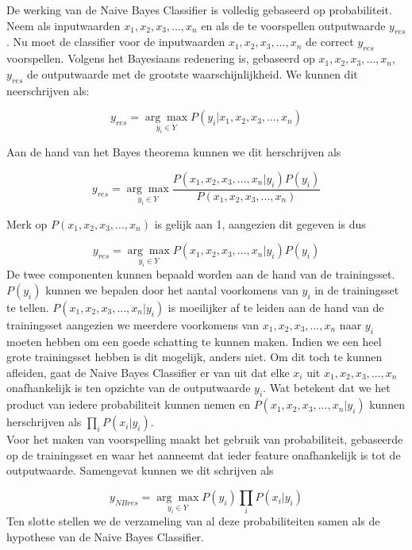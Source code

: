 %
De werking van de Naive Bayes Classifier is volledig gebaseerd op probabiliteit. Neem als inputwaarden $x_{1} , x_{2}, x_{3}, ..., x_{n}$ en als de te voorspellen outputwaarde $y_{res}$. Nu moet de classifier voor de inputwaarden $x_{1} , x_{2}, x_{3}, ..., x_{n}$ de correct $y_{res}$ voorspellen. Volgens het Bayesiaans redenering is, gebaseerd op $x_{1} , x_{2}, x_{3}, ..., x_{n}$,  $y_{res}$ de outputwaarde met de grootste waarschijnlijkheid. We kunnen dit neerschrijven als:

\[y_{res} = \underset{y_i \in Y}{\arg\max}P(y_i|x_{1},x_{2},x_{3},...,x_{n}) \] 

Aan de hand van het Bayes theorema kunnen we dit herschrijven als

\[ y_{res} = \underset{y_i \in Y}{\arg\max}\frac{P(x_{1},x_{2},x_{3},...,x_{n}|y_i)P(y_i)}{P(x_{1},x_{2}, x_{3},...,x_{n})} \]

 Merk op $P(x_{1},x_{2},x_{3},...,x_{n})$ is gelijk aan 1, aangezien dit gegeven is dus

 \[ y_{res} = \underset{y_i \in Y}{\arg\max}P(x_{1},x_{2},x_{3},...,x_{n}|y_i)P(y_i) \]
%
 De twee componenten kunnen bepaald worden aan de hand van de trainingsset. $P(y_i)$ kunnen we bepalen door het aantal voorkomens van $y_i$ in de trainingsset te tellen. $P(x_{1},x_{2},x_{3},...,x_{n}|y_i)$ is moeilijker af te leiden aan de hand van de trainingsset aangezien we meerdere voorkomens van $x_{1},x_{2},x_{3},...,x_{n}$ naar $y_i$ moeten hebben om een goede schatting te kunnen maken.  Indien we een heel grote trainingsset hebben is dit mogelijk, anders niet. Om dit toch te kunnen afleiden, gaat de Naive Bayes Classifier er van uit dat elke $x_i$ uit $x_{1},x_{2},x_{3},...,x_{n}$ onafhankelijk is ten opzichte van de outputwaarde $y_i$. Wat betekent dat we het product van iedere probabiliteit kunnen nemen en $P(x_{1},x_{2},x_{3},...,x_{n}|y_i)$  kunnen herschrijven als $\prod\limits_{i} P(x_{i}|y_{i})$.\\
%
Voor het maken van voorspelling maakt het gebruik van probabiliteit, gebaseerde op de trainingsset en waar het aanneemt dat ieder feature onafhankelijk is tot de outputwaarde. Samengevat kunnen we dit schrijven als

 \[y_{NBres} = \underset{y_i \in Y}{\arg\max} P(y_{i})\prod\limits_{i} P(x_{i}|y_{i}) \]
%
Ten slotte stellen we de verzameling van al deze probabiliteiten samen als de hypothese van de Naive Bayes Classifier.

